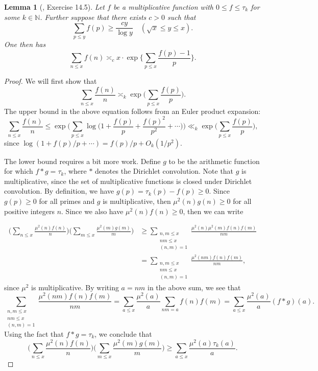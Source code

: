 \documentclass{amsart}
\newtheorem{lemma}[theorem]{Lemma}
\theoremstyle{definition}
\numberwithin{equation}{section}
\newcommand{\N}{\mathbb{N}}
\begin{document}
	
	\begin{lemma}[\cite{koukoulopoulos2019distribution}, Exercise 14.5]\label{dim Brun}
		Let $f$ be a multiplicative function with $0 \leq f \leq \tau_k$ for some $k \in \N$. Further suppose that there exists $c>0$ such that
		$$\sum_{p \leq y}f(p) \geq \frac{c y}{\log y}\quad (\sqrt{x} \leq y \leq x).$$
		One then has
		$$\sum_{n \leq x}f(n) \asymp_{c} x \cdot \exp\bigg\{\sum_{p \leq x} \frac{f(p) - 1}{p}\bigg\}.$$
	\end{lemma}
	\begin{proof}
		We will first show that \begin{equation*}
			\sum_{n \leq x}\frac{f(n)}{n} \asymp_k \exp\bigg(\sum_{p \leq x} \frac{f(p)}{p} \bigg).
		\end{equation*}
		The upper bound in the above equation follows from an Euler product expansion:
		\begin{equation}\label{ex 14.5 eq 6}
			\sum_{n \leq x}\frac{f(n)}{n} \le \exp\bigg(\sum_{p \leq x} \log \Big(1+\frac{f(p)}{p}+\frac{f(p)^2}{p^2}+\cdots \Big)\bigg) \ll_k \exp\bigg(\sum_{p \leq x} \frac{f(p)}{p} \bigg),
		\end{equation}
		since $\log(1+f(p)/p+\cdots) = f(p)/p +O_k(1/p^2)$. 
		
		The lower bound requires a bit more work. Define $g$ to be the arithmetic function for which $f * g = \tau_k$, where $*$ denotes the Dirichlet convolution.  Note that $g$ is multiplicative, since the set of multiplicative functions is closed under Dirichlet convolution. By definition, we have $g(p) = \tau_k(p) - f(p) \geq 0$. Since $g(p) \ge 0$ for all primes and $g$ is multiplicative, then $\mu^2(n)g(n) \geq 0$ for all positive integers $n$. Since we also have $\mu^2(n) f(n) \ge 0$, then we can write
		
		\begin{align*}
			\bigg(\sum_{n \leq x} \frac{\mu^2(n)f(n)}{n}\bigg)\bigg(\sum_{m \leq x} \frac{\mu^2(m)g(m)}{m}\bigg) &\geq \sum_{\substack{n,m \le x \\ nm \le x \\ (n,m) = 1}} \frac{\mu^2(n)\mu^2(m)f(n)f(m)}{nm} \\ &= \sum_{\substack{n,m \le x \\ nm \le x \\ (n,m) = 1}} \frac{\mu^2(nm)f(n)f(m)}{nm},
		\end{align*}
		since $\mu^2$ is multiplicative. By writing $a = nm$ in the above sum, we see that
		\begin{equation*}
			\sum_{\substack{n,m \le x \\ nm \le x \\ (n,m) = 1}} \frac{\mu^2(nm)f(n)f(m)}{nm} = \sum_{a \leq x} \frac{\mu^2(a)}{a}\sum_{nm=a} f(n)f(m) =  \sum_{a \leq x} \frac{\mu^2(a)}{a} (f*g)(a).
		\end{equation*}
		Using the fact that $f*g = \tau_k$, we conclude that
		\begin{equation}\label{ex 14.5 eq 1}
			\bigg(\sum_{n \leq x} \frac{\mu^2(n)f(n)}{n}\bigg)\bigg(\sum_{m \leq x} \frac{\mu^2(m)g(m)}{m}\bigg) \geq \sum_{a \leq x} \frac{\mu^2(a) \tau_k(a)}{a}.
		\end{equation}
		

\end{proof}
\end{document}

